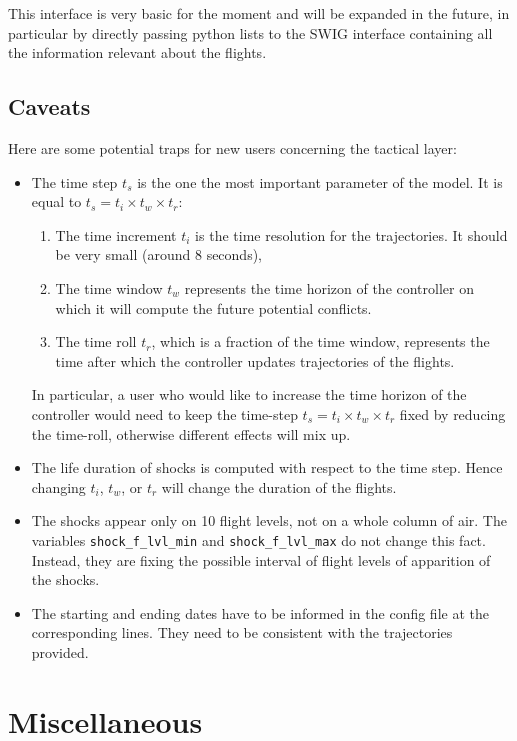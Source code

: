 \documentclass[12pt]{article}
\begin{document}
This interface is very basic for the moment and will be expanded in the future, in particular by directly passing python lists to the SWIG interface containing all the information relevant about the flights.

\subsection{Caveats}
\label{subsec:caveats}

Here are some potential traps for new users concerning the tactical layer:
\begin{itemize}
\item The time step $t_s$ is the one the most important parameter of the model. It is equal to $t_s = t_i \times t_w\times t_r$:
\begin{enumerate}
\item The time increment $t_i$ is the time resolution for the trajectories. It should be very small (around 8 seconds),
\item The time window $t_w$ represents the time horizon of the controller on which it will compute the future potential conflicts.
\item The time roll $t_r$, which is a fraction of the time window, represents the time after which the controller updates trajectories of the flights.
\end{enumerate}
In particular, a user who would like to increase the time horizon of the controller would need to keep the time-step $t_s = t_i \times t_w\times t_r$ fixed by reducing the time-roll, otherwise different effects will mix up.
\item The life duration of shocks is computed with respect to the time step. Hence changing $t_i$, $t_w$, or $t_r$ will change the duration of the flights.
\item The shocks appear only on 10 flight levels, not on a whole column of air. The variables \verb|shock_f_lvl_min| and \verb|shock_f_lvl_max| do not change this fact. Instead, they are fixing the possible interval of flight levels of apparition of the shocks.
\item The starting and ending dates have to be informed in the config file at the corresponding lines. They need to be consistent with the trajectories provided. 
\end{itemize}

\section{Miscellaneous}
\end{document}

